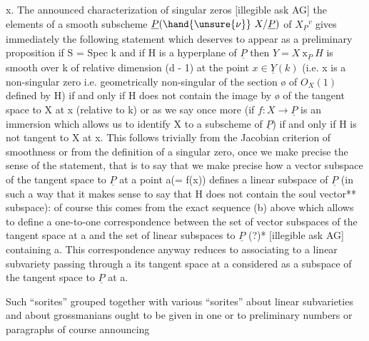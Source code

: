 
x.  The announced characterization of singular zeros [illegible
ask AG] the elements of a smooth subscheme $\underline{P}(\hand{\unsure{\nu}}\ X/\underline{P})$ of $X_{\underline{P}}{}^{v}$ gives
immediately the following statement which deserves to appear as a
preliminary proposition if S = Spec k and if H is a hyperplane of
$\underline{P}$ then $Y = X \ \mathrm{x}_{\underline{P}}\ H$ is smooth over k of relative dimension (d - 1)
at the point $x \in \underline{Y}(k)$ (i.e. x is a non-singular zero i.e.
geometrically non-singular of the section {\o} of $O_X(1)$ defined by H)
if and only if H does not contain the image by {\o} of the tangent
space to X at x (relative to k) or as we say once more (if
$f{:}X \to \underline{P}$ is an immersion which allows us to identify X to a
subscheme of $\underline{P}$) if and only if H is not tangent to X at x.  This
follows trivially from the Jacobian criterion of smoothness or
from the definition of a singular zero, once we make precise the
sense of the statement, that is to say that we make precise how a
vector subspace of the tangent space to $\underline{P}$ at a point a(= f(x))
defines a linear subspace of $\underline{P}$ (in such a way that it makes sense
to say that H does not contain the soul vector** subspace): of
course this comes from the exact sequence (b) above which allows
to define a one-to-one correspondence between the set of vector
subspaces of the tangent space at a and the set of linear
subspaces to $\underline{P}$ (?)* [illegible ask AG] containing a.  This
correspondence anyway reduces to associating to a linear
subvariety passing through a its tangent space at a considered as
a subspace of the tangent space to $\underline{P}$ at a.

Such ``sorites'' grouped together with various ``sorites'' about
linear subvarieties and about grossmanians ought to be given in
one or to preliminary numbers or paragraphs of course announcing

